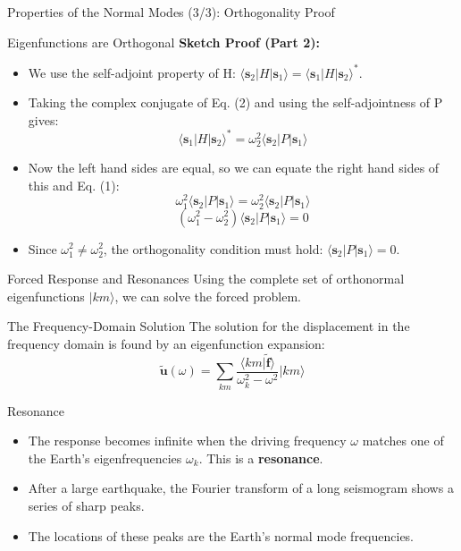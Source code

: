 \documentclass{beamer}
\begin{document}
\begin{frame}{Properties of the Normal Modes (3/3): Orthogonality Proof}
    \begin{block}{Eigenfunctions are Orthogonal}
        \textbf{Sketch Proof (Part 2):}
        \begin{itemize}
            \item We use the self-adjoint property of H: $\langle \mathbf{s}_2|H|\mathbf{s}_1\rangle = \langle \mathbf{s}_1|H|\mathbf{s}_2\rangle^*$.
            \pause
            \item Taking the complex conjugate of Eq. (2) and using the self-adjointness of P gives:
            $$ \langle \mathbf{s}_1|H|\mathbf{s}_2\rangle^* = \omega_2^2 \langle \mathbf{s}_2|P|\mathbf{s}_1\rangle $$
            \pause
            \item Now the left hand sides are equal, so we can equate the right hand sides of this and Eq. (1):
            $$ \omega_1^2 \langle \mathbf{s}_2|P|\mathbf{s}_1\rangle = \omega_2^2 \langle \mathbf{s}_2|P|\mathbf{s}_1\rangle $$
            $$ (\omega_1^2 - \omega_2^2)\langle \mathbf{s}_2|P|\mathbf{s}_1\rangle = 0 $$
            \pause
            \item Since $\omega_1^2 \neq \omega_2^2$, the orthogonality condition must hold: $\langle \mathbf{s}_2|P|\mathbf{s}_1\rangle = 0$.
        \end{itemize}
    \end{block}
\end{frame}


\begin{frame}{Forced Response and Resonances}
    Using the complete set of orthonormal eigenfunctions $|km\rangle$, we can solve the forced problem.
    \begin{alertblock}{The Frequency-Domain Solution}
        The solution for the displacement in the frequency domain is found by an eigenfunction expansion:
        $$ \tilde{\mathbf{u}}(\omega) = \sum_{km}\frac{\langle km|\tilde{\mathbf{f}}\rangle}{\omega_{k}^{2}-\omega^{2}}|km\rangle $$
    \end{alertblock}
    \pause
    \begin{block}{Resonance}
        \begin{itemize}
            \item The response becomes infinite when the driving frequency $\omega$ matches one of the Earth's eigenfrequencies $\omega_k$. This is a \textbf{resonance}.
            \pause
            \item After a large earthquake, the Fourier transform of a long seismogram shows a series of sharp peaks.
            \pause
            \item The locations of these peaks are the Earth's normal mode frequencies.
        \end{itemize}
    \end{block}
\end{frame}
\end{document}
